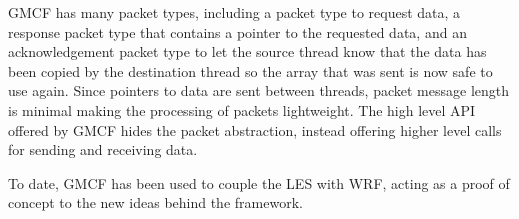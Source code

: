 GMCF has many packet types, including a packet type to request data, a response
packet type that contains a pointer to the requested data, and an
acknowledgement packet type to let the source thread know that the data has been
copied by the destination thread so the array that was sent is now safe to use
again. Since pointers to data are sent between threads, packet message length is
minimal making the processing of packets lightweight. The high level API offered
by GMCF hides the packet abstraction, instead offering higher level calls for
sending and receiving data.

To date, GMCF has been used to couple the LES with WRF, acting as a proof of
concept to the new ideas behind the framework.
